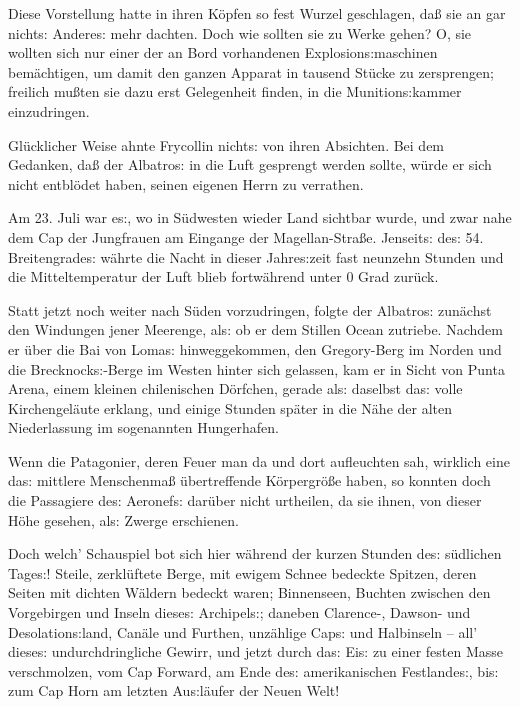 \documentclass[oneside,12pt]{book}
\newcommand{\s}{s:}
\begin{document}
Diese Vorstellung hatte in ihren K\"opfen so fest Wurzel geschlagen,
da{\ss} sie an gar nicht{\s} Andere{\s} mehr dachten. Doch wie
sollten sie zu Werke gehen? O, sie wollten sich nur einer der an Bord
vorhandenen Explosion{\s}maschinen bem\"achtigen, um damit den ganzen
Apparat in tausend St\"ucke zu zersprengen; freilich mu{\ss}ten sie
dazu erst Gelegenheit finden, in die Munition{\s}kammer einzudringen.

Gl\"ucklicher Weise ahnte Frycollin nicht{\s} von ihren Absichten.
Bei dem Gedanken, da{\ss} der {\glqq}Albatro{\s}{\grqq} in die Luft
gesprengt werden sollte, w\"urde er sich nicht entbl\"odet haben,
seinen eigenen Herrn zu verrathen.

Am 23. Juli war e{\s}, wo in S\"udwesten wieder Land sichtbar wurde,
und zwar nahe dem Cap der Jungfrauen am Eingange der
Magellan-Stra{\ss}e. Jenseit{\s} de{\s} 54. Breitengrade{\s} w\"ahrte
die Nacht in dieser Jahre{\s}zeit fast neunzehn Stunden und die
Mitteltemperatur der Luft blieb fortw\"ahrend unter 0 Grad zur\"uck.

Statt jetzt noch weiter nach S\"uden vorzudringen, folgte der
{\glqq}Albatro{\s}{\grqq} zun\"achst den Windungen jener Meerenge,
al{\s} ob er dem Stillen Ocean zutriebe. Nachdem er \"uber die Bai
von Loma{\s} hinweggekommen, den Gregory-Berg im Norden und die
Brecknock{\s}-Berge im Westen hinter sich gelassen, kam er in Sicht
von Punta Arena, einem kleinen chilenischen D\"orfchen, gerade al{\s}
daselbst da{\s} volle Kirchengel\"aute erklang, und einige Stunden
sp\"ater in die N\"ahe der alten Niederlassung im sogenannten
Hungerhafen.

Wenn die Patagonier, deren Feuer man da und dort aufleuchten sah,
wirklich eine da{\s} mittlere Menschenma{\ss} \"ubertreffende
K\"orpergr\"o{\ss}e haben, so konnten doch die Passagiere de{\s}
Aeronef{\s} dar\"uber nicht urtheilen, da sie ihnen, von dieser
H\"ohe gesehen, al{\s} Zwerge erschienen.

Doch welch' Schauspiel bot sich hier w\"ahrend der kurzen Stunden
de{\s} s\"udlichen Tage{\s}! Steile, zerkl\"uftete Berge, mit ewigem
Schnee bedeckte Spitzen, deren Seiten mit dichten W\"aldern bedeckt
waren; Binnenseen, Buchten zwischen den Vorgebirgen und Inseln
diese{\s} Archipel{\s}; daneben \mbox{Clarence-,} Dawson- und
Desolation{\s}land, Can\"ale und Furthen, unz\"ahlige Cap{\s} und
Halbinseln -- all' diese{\s} undurchdringliche Gewirr, und jetzt
durch da{\s} Ei{\s} zu einer festen Masse verschmolzen, vom Cap
Forward, am Ende de{\s} amerikanischen Festlande{\s}, bi{\s} zum Cap
Horn am letzten Au{\s}l\"aufer der Neuen Welt!
\end{document}
